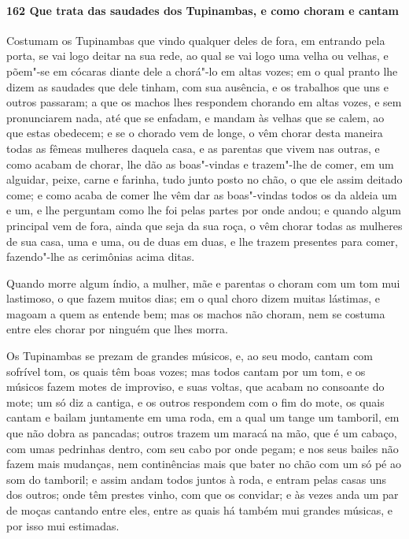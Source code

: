 \begin{linenumbers}
\paragraph{162 Que trata das saudades dos Tupinambas, e como choram e cantam}\quad
Costumam os Tupinambas que vindo qualquer deles de fora, em entrando pela porta, se vai
logo deitar na sua rede, ao qual se vai logo uma velha ou velhas, e põem"-se em cócaras
diante dele a chorá"-lo em altas vozes; em o qual pranto lhe dizem as saudades que dele
tinham, com sua ausência, e os trabalhos que uns e outros passaram; a que os machos lhes
respondem chorando em altas vozes, e sem pronunciarem nada, até que se enfadam, e mandam
às velhas que se calem, ao que estas obedecem; e se o chorado vem de longe, o vêm chorar
desta maneira todas as fêmeas mulheres daquela casa, e as parentas que vivem nas outras, e
como acabam de chorar, lhe dão as boas"-vindas e trazem"-lhe de comer, em um alguidar,
peixe, carne e farinha, tudo junto posto no chão, o que ele assim deitado come; e como
acaba de comer lhe vêm dar as boas"-vindas todos os da aldeia um e um, e lhe perguntam como
lhe foi pelas partes por onde andou; e quando algum principal vem de fora, ainda que seja
da sua roça, o vêm chorar todas as mulheres de sua casa, uma e uma, ou de duas em duas, e
lhe trazem presentes para comer, fazendo"-lhe as cerimônias acima ditas.

Quando morre algum índio, a mulher, mãe e parentas o choram com um tom mui lastimoso, o
que fazem muitos dias; em o qual choro dizem muitas lástimas, e magoam a quem as entende
bem; mas os machos não choram, nem se costuma entre eles chorar por ninguém que lhes
morra.

Os Tupinambas se prezam de grandes músicos, e, ao seu modo, cantam com sofrível tom, os
quais têm boas vozes; mas todos cantam por um tom, e os músicos fazem motes de improviso,
e suas voltas, que acabam no consoante do mote; um só diz a cantiga, e os outros respondem
com o fim do mote, os quais cantam e bailam juntamente em uma roda, em a qual um tange um
tamboril, em que não dobra as pancadas; outros trazem um maracá na mão, que é um cabaço,
com umas pedrinhas dentro, com seu cabo por onde pegam; e nos seus bailes não fazem mais
mudanças, nem continências mais que bater no chão com um só pé ao som do tamboril; e assim
andam todos juntos à roda, e entram pelas casas uns dos outros; onde têm prestes vinho,
com que os convidar; e às vezes anda um par de moças cantando entre eles, entre as quais
há também mui grandes músicas, e por isso mui estimadas.


\end{linenumbers}
